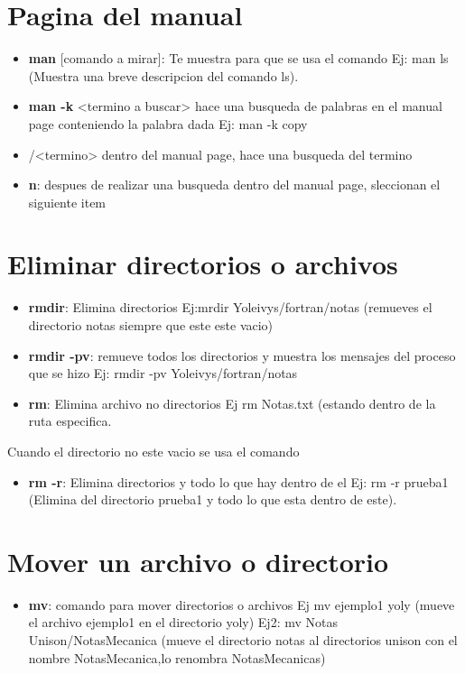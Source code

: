\documentclass[12pt,a4paper]{article}
\begin{document}
\section{Pagina del manual}
\begin{itemize}
\item \textbf{man} [comando a mirar]: Te muestra para que se usa el comando Ej: man ls (Muestra una breve descripcion del comando ls).
\item \textbf{man -k }<termino a buscar> hace una busqueda de palabras en el manual page conteniendo la palabra dada Ej: man -k copy 
\item /<termino> dentro del manual page, hace una busqueda del termino
\item \textbf{n}: despues de realizar una busqueda dentro del manual page, sleccionan el siguiente item
\end{itemize}

\section{Eliminar directorios o archivos}
\begin{itemize}
\item \textbf{rmdir}: Elimina directorios Ej:mrdir Yoleivys/fortran/notas (remueves el directorio notas siempre que este este vacio) 
\item \textbf{rmdir -pv}: remueve todos los directorios y muestra los mensajes del proceso que se hizo Ej: rmdir -pv Yoleivys/fortran/notas
\item \textbf{rm}: Elimina archivo no directorios Ej rm Notas.txt (estando dentro de la ruta especifica.
\end{itemize}
Cuando el directorio no este vacio se usa el comando
\begin{itemize}
\item \textbf{rm -r}: Elimina directorios y todo lo que hay dentro de el Ej: rm -r prueba1 (Elimina del directorio prueba1 y todo lo que esta dentro de este).
\end{itemize}

\section{Mover un archivo o directorio}
\begin{itemize}
\item \textbf{mv}: comando para mover directorios o archivos Ej mv ejemplo1 yoly (mueve el archivo ejemplo1 en el directorio yoly) Ej2: mv Notas Unison/NotasMecanica (mueve el directorio notas al directorios unison con el nombre NotasMecanica,lo renombra NotasMecanicas)

\end{itemize}
\end{document}
